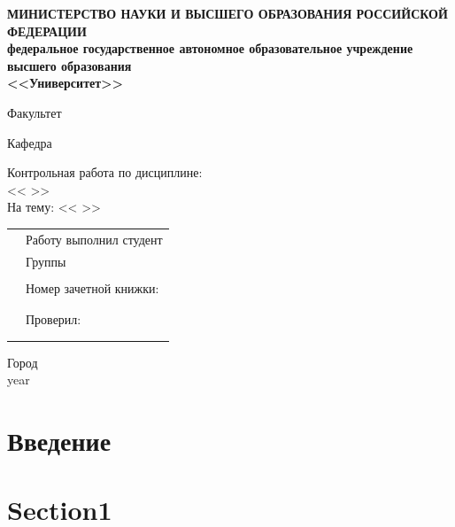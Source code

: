\documentclass[14pt,A4]{extarticle}
\begin{document}
 \begin{titlepage}
  \begin{center}
  {\fontsize{10}{12}\selectfont \bf
  МИНИСТЕРСТВО НАУКИ И ВЫСШЕГО ОБРАЗОВАНИЯ РОССИЙСКОЙ ФЕДЕРАЦИИ\\
  федеральное государственное автономное образовательное учреждение высшего образования\\
  
  <<Университет>>}
  
  \vspace{1cm}
  Факультет
  
  \vspace{1cm}
  Кафедра 
  
  \vspace{2cm}
  Контрольная работа по дисциплине: \\
  <<  >>\\
  
  На тему: <<  >> \\
  \vspace{2cm}
  
  \begin{tabular}{m{10cm} m{10cm}}
    & Работу выполнил студент\\
    & Группы \\
    &  \\
    & Номер зачетной книжки:\\
    &  \\
    & \\
    & Проверил:\\
    &  \\
    &  \\
  \end{tabular}

  \vspace{2cm}
  Город \\
  year
 \end{center}
  \end{titlepage}

  \tableofcontents
  
  \newpage



\section*{Введение}





\newpage

\section{Section1}
\end{document}
